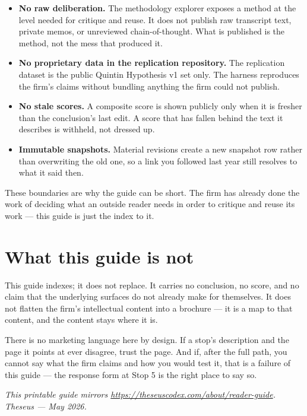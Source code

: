 \documentclass[11pt,letterpaper]{article}
\begin{document}
\begin{itemize}[leftmargin=*,itemsep=0.3em]
  \item \textbf{No raw deliberation.} The methodology explorer exposes a method at the level needed for critique and reuse. It does not publish raw transcript text, private memos, or unreviewed chain-of-thought. What is published is the method, not the mess that produced it.
  \item \textbf{No proprietary data in the replication repository.} The replication dataset is the public Quintin Hypothesis v1 set only. The harness reproduces the firm's claims without bundling anything the firm could not publish.
  \item \textbf{No stale scores.} A composite score is shown publicly only when it is fresher than the conclusion's last edit. A score that has fallen behind the text it describes is withheld, not dressed up.
  \item \textbf{Immutable snapshots.} Material revisions create a new snapshot row rather than overwriting the old one, so a link you followed last year still resolves to what it said then.
\end{itemize}

These boundaries are why the guide can be short. The firm has already done the work of deciding what an outside reader needs in order to critique and reuse its work --- this guide is just the index to it.

\section{What this guide is not}

This guide indexes; it does not replace. It carries no conclusion, no score, and no claim that the underlying surfaces do not already make for themselves. It does not flatten the firm's intellectual content into a brochure --- it is a map to that content, and the content stays where it is.

There is no marketing language here by design. If a stop's description and the page it points at ever disagree, trust the page. And if, after the full path, you cannot say what the firm claims and how you would test it, that is a failure of this guide --- the response form at Stop 5 is the right place to say so.

\vfill

\begin{center}
\small\itshape
This printable guide mirrors \url{https://theseuscodex.com/about/reader-guide}.\\
Theseus --- May 2026.
\end{center}
\end{document}
